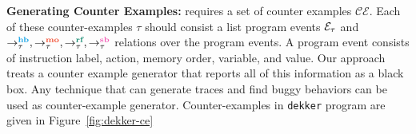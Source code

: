 \noindent\textbf{Generating Counter Examples:} 
\ourtechnique requires a set of counter examples $ \mathcal{CE} $. 
Each of these counter-examples $ \tau $ should consist a list program events 
$ \mathcal{E}_\tau $ and $ \setHB, \setMO, \setRF, \setSB $ relations over the 
program events. 
A program event consists of instruction label, action, memory order, variable, and value. 
Our approach treats a counter example generator that reports all of this information as a black box. 
Any technique that can generate \cc traces and find buggy behaviors can be used as counter-example generator.
Counter-examples in \texttt{dekker} program are given in Figure~\ref{fig:dekker-ce}





%
%

